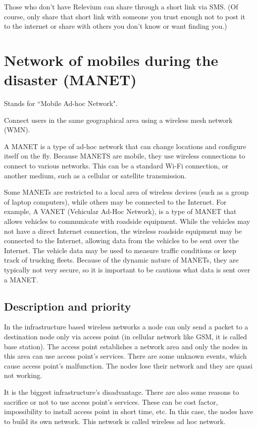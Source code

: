 \documentclass{scrreprt}
\begin{document}
Those who don’t have Relevium can share through a short link via SMS. (Of course, only share that short link with someone you trust enough not to post it to the internet or share with others you don’t know or want finding you.)


\section{Network of mobiles during the disaster (MANET)}

Stands for ``Mobile Ad-hoc Network".

Connect users in the same geographical area using a wireless mesh network (WMN).



A MANET is a type of ad-hoc network that can change locations and configure itself on the fly. Because MANETS are mobile, they use wireless connections to connect to various networks. This can be a standard Wi-Fi connection, or another medium, such as a cellular or satellite transmission.

Some MANETs are restricted to a local area of wireless devices (such as a group of laptop computers), while others may be connected to the Internet. For example, A VANET (Vehicular Ad-Hoc Network), is a type of MANET that allows vehicles to communicate with roadside equipment. While the vehicles may not have a direct Internet connection, the wireless roadside equipment may be connected to the Internet, allowing data from the vehicles to be sent over the Internet. The vehicle data may be used to measure traffic conditions or keep track of trucking fleets. Because of the dynamic nature of MANETs, they are typically not very secure, so it is important to be cautious what data is sent over a MANET.

\subsection{Description and priority}

In the infrastructure based wireless networks a node can only send a packet to a destination node only via access point (in cellular network like GSM, it is called
base station). The access point establishes a network area and
only the nodes in this area can use access point’s services.
There are some unknown events, which cause access point’s
malfunction. The nodes lose their network and they are quasi
not working.

It is the biggest infrastructure’s disadvantage.
There are also some reasons to sacrifice or not to use access
point’s services. These can be cost factor, impossibility to
install access point in short time, etc. In this case, the nodes
have to build its own network. This network is called wireless
ad hoc network.
\end{document}
